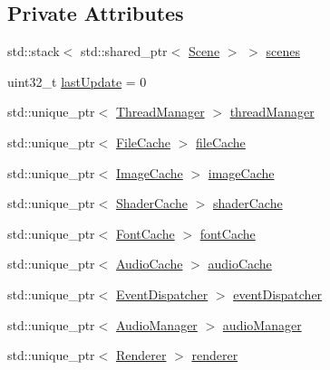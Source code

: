 \subsection*{Private Attributes}
\begin{DoxyCompactItemize}
\item 
std\+::stack$<$ std\+::shared\+\_\+ptr$<$ \mbox{\hyperlink{classsage_1_1Scene}{Scene}} $>$ $>$ \mbox{\hyperlink{classsage_1_1Application_a3365f5f5f8f63eeca5e778ded7dbe210}{scenes}}
\item 
uint32\+\_\+t \mbox{\hyperlink{classsage_1_1Application_a08facf4df89e707b2a07a1be0782643a}{last\+Update}} = 0
\item 
std\+::unique\+\_\+ptr$<$ \mbox{\hyperlink{classsage_1_1ThreadManager}{Thread\+Manager}} $>$ \mbox{\hyperlink{classsage_1_1Application_a32a666257ae6b2729ebaf2906abc13d4}{thread\+Manager}}
\item 
std\+::unique\+\_\+ptr$<$ \mbox{\hyperlink{classsage_1_1FileCache}{File\+Cache}} $>$ \mbox{\hyperlink{classsage_1_1Application_adaaeb004710d17aaff977ba58acaa9a5}{file\+Cache}}
\item 
std\+::unique\+\_\+ptr$<$ \mbox{\hyperlink{classsage_1_1ImageCache}{Image\+Cache}} $>$ \mbox{\hyperlink{classsage_1_1Application_a951b28603bbc30da98db70a1757ac526}{image\+Cache}}
\item 
std\+::unique\+\_\+ptr$<$ \mbox{\hyperlink{classsage_1_1ShaderCache}{Shader\+Cache}} $>$ \mbox{\hyperlink{classsage_1_1Application_a9a7bcc406dca9a460d54f11c2eda47c4}{shader\+Cache}}
\item 
std\+::unique\+\_\+ptr$<$ \mbox{\hyperlink{classsage_1_1FontCache}{Font\+Cache}} $>$ \mbox{\hyperlink{classsage_1_1Application_a5b1d694037e52b302d32e99ff532277d}{font\+Cache}}
\item 
std\+::unique\+\_\+ptr$<$ \mbox{\hyperlink{classsage_1_1AudioCache}{Audio\+Cache}} $>$ \mbox{\hyperlink{classsage_1_1Application_a84a266e1a477f1c82d36e4cb5c2feab8}{audio\+Cache}}
\item 
std\+::unique\+\_\+ptr$<$ \mbox{\hyperlink{classsage_1_1EventDispatcher}{Event\+Dispatcher}} $>$ \mbox{\hyperlink{classsage_1_1Application_ae7cbe4333c8c285fb78fa6d561090281}{event\+Dispatcher}}
\item 
std\+::unique\+\_\+ptr$<$ \mbox{\hyperlink{classsage_1_1AudioManager}{Audio\+Manager}} $>$ \mbox{\hyperlink{classsage_1_1Application_ac581d8db2c28c51373d3eae40e816620}{audio\+Manager}}
\item 
std\+::unique\+\_\+ptr$<$ \mbox{\hyperlink{classsage_1_1Renderer}{Renderer}} $>$ \mbox{\hyperlink{classsage_1_1Application_ac0297e6d65ef3662c807f4026f63c8ba}{renderer}}

\end{DoxyCompactItemize}
